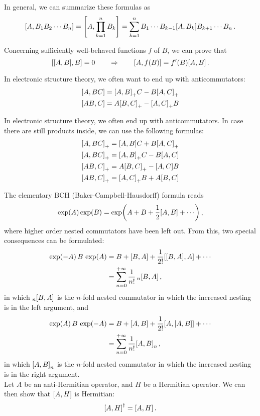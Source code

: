     In general, we can summarize these formulas as
    \begin{equation}
        \comm{A}{B_1 B_2 \cdots B_n} = \comm{A}{\prod_{k=1}^n B_k} = \sum_{k=1}^n B_1 \cdots B_{k-1} \comm{A}{B_k} B_{k+1} \cdots B_n \thinspace .
    \end{equation}

    Concerning sufficiently well-behaved functions $f$ of $B$, we can prove that
    \begin{equation}
        \comm{\comm{A}{B}}{B} = 0 \qquad\Rightarrow\qquad \comm{A}{f(B)} = f'(B) \comm{A}{B} \thinspace .
    \end{equation}

    In electronic structure theory, we often want to end up with anticommutators:
    \begin{align}
        & \comm{A}{BC} = \comm{A}{B}_+ C - B \comm{A}{C}_+ \\
        & \comm{AB}{C} = A \comm{B}{C}_+ - \comm{A}{C}_+ B
    \end{align}

    In electronic structure theory, we often end up with anticommutators. In case there are still products inside, we can use the following formulas:
    \begin{align}
        & \comm{A}{BC}_+ = \comm{A}{B} C + B \comm{A}{C}_+ \\
        & \comm{A}{BC}_+ = \comm{A}{B}_+ C - B \comm{A}{C} \\
        & \comm{AB}{C}_+ = A \comm{B}{C}_+ - \comm{A}{C} B \\
        & \comm{AB}{C}_+ = \comm{A}{C}_+ B + A \comm{B}{C}
    \end{align}

    The elementary BCH (Baker-Campbell-Hausdorff) formula reads
    \begin{equation}
        \exp(A) \exp(B) = \exp(A + B + \frac{1}{2} \comm{A}{B} + \cdots) \thinspace ,
    \end{equation}
    where higher order nested commutators have been left out. From this, two special consequences can be formulated:
    \begin{align}
        \exp(-A) \thinspace B \thinspace \exp(A) &= B + \comm{B}{A} + \frac{1}{2!} \comm{\comm{B}{A}}{A} + \cdots \\
        &= \sum_{n=0}^{+ \infty} \frac{1}{n!} \thinspace {}_n\comm{B}{A} \thinspace ,
    \end{align}
    in which ${}_n\comm{B}{A}$ is the $n$-fold nested commutator in which the increased nesting is in the left argument, and
    \begin{align}
        \exp(A) \thinspace B \thinspace \exp(-A) &= B + \comm{A}{B} + \frac{1}{2!} \comm{A}{\comm{A}{B}} + \cdots \\
        &= \sum_{n=0}^{+ \infty} \frac{1}{n!} \comm{A}{B}_n \thinspace ,
    \end{align}
    in which $\comm{A}{B}_n$ is the $n$-fold nested commutator in which the increased nesting is in the right argument. \\

    Let $A$ be an anti-Hermitian operator, and $H$ be a Hermitian operator. We can then show that $\comm{A}{H}$ is Hermitian:
    \begin{equation}
        \comm{A}{H}^\dagger = \comm{A}{H} \thinspace .
    \end{equation}
